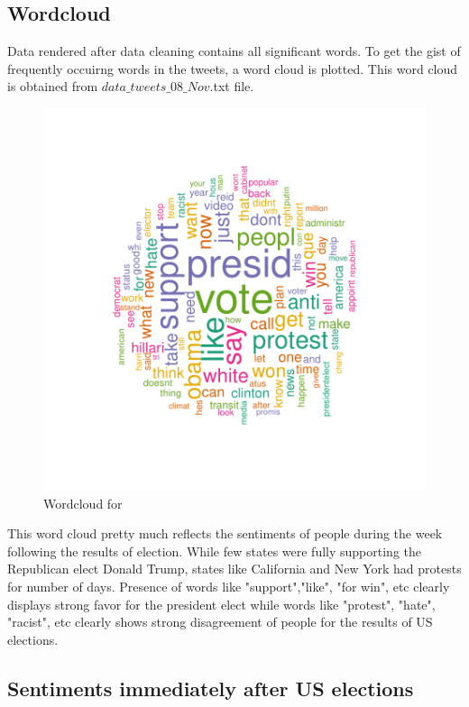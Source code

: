 \documentclass[a4paper,12pt]{book}
\theoremstyle{break}
\begin{document}
\subsection{Wordcloud}

Data rendered after data cleaning contains all significant words. To get the gist of frequently occuirng words in the tweets, a word cloud is plotted. This word cloud is obtained from $data\_tweets\_08\_Nov$.txt file.

\begin{figure}[H]
\centering

\includegraphics{finnn-r4}
\caption{Wordcloud for }
\label{fig:1}
\end{figure}

This word cloud pretty much reflects the sentiments of people during the week following the results of election. While few states were fully supporting the Republican elect Donald Trump, states like California and New York had protests for number of days. Presence of words like "support","like", "for win", etc clearly displays strong favor for the president elect while words like "protest", "hate", "racist", etc clearly shows strong disagreement of people for the results of US elections.

\subsection{Sentiments immediately after US elections}
\end{document}
